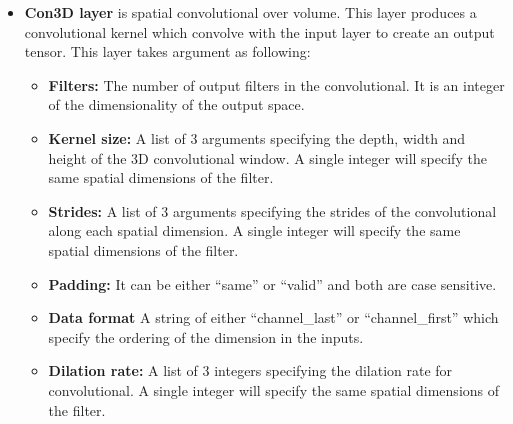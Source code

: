 \begin{itemize}
    \item \textbf{Con3D layer} is spatial convolutional over volume. This layer produces a convolutional kernel which convolve with the input layer to create an output tensor. This layer takes argument as following:\\
    \noindent{}
    \begin{itemize}
        \item \textbf{Filters:} The number of output filters in the convolutional. It is an integer of the dimensionality of the output space. 
        \item \textbf{Kernel size:} A list of 3 arguments specifying the depth, width and height of the 3D convolutional window. A single integer will specify the same spatial dimensions of the filter.
        \item \textbf{Strides:} A list of 3 arguments specifying the strides of the convolutional along each spatial dimension. A single integer will specify the same spatial dimensions of the filter.
        \item \textbf{Padding:} It can be either “same” or “valid” and both are case sensitive.
        \item \textbf{Data format} A string of either “channel\_last” or “channel\_first” which specify the ordering of the dimension in the inputs. 
        \item \textbf{Dilation rate:} A list of 3 integers specifying the dilation rate for convolutional. A single integer will specify the same spatial dimensions of the filter.

\end{itemize}
\end{itemize}
